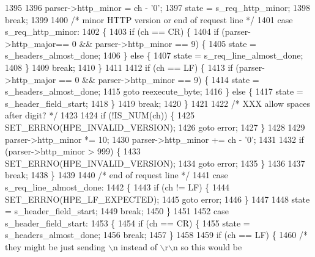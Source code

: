 \begin{DoxyCode}
1395 
1396         parser->http_minor = ch - \textcolor{charliteral}{'0'};
1397         state = s_req_http_minor;
1398         \textcolor{keywordflow}{break};
1399 
1400       \textcolor{comment}{/* minor HTTP version or end of request line */}
1401       \textcolor{keywordflow}{case} s_req_http_minor:
1402       \{
1403         \textcolor{keywordflow}{if} (ch == CR) \{
1404           \textcolor{keywordflow}{if} (parser->http_major== 0 && parser->http_minor == 9) \{
1405             state = s_headers_almost_done;
1406           \} \textcolor{keywordflow}{else} \{
1407             state = s_req_line_almost_done;
1408           \}
1409           \textcolor{keywordflow}{break};
1410         \}
1411 
1412         \textcolor{keywordflow}{if} (ch == LF) \{
1413           \textcolor{keywordflow}{if} (parser->http_major == 0 && parser->http_minor == 9) \{
1414             state = s_headers_almost_done;
1415             \textcolor{keywordflow}{goto} reexecute\_byte;
1416           \} \textcolor{keywordflow}{else} \{
1417             state = s_header_field_start;
1418           \}
1419           \textcolor{keywordflow}{break};
1420         \}
1421 
1422         \textcolor{comment}{/* XXX allow spaces after digit? */}
1423 
1424         \textcolor{keywordflow}{if} (!IS_NUM(ch)) \{
1425           SET_ERRNO(HPE_INVALID_VERSION);
1426           \textcolor{keywordflow}{goto} error;
1427         \}
1428 
1429         parser->http_minor *= 10;
1430         parser->http_minor += ch - \textcolor{charliteral}{'0'};
1431 
1432         \textcolor{keywordflow}{if} (parser->http_minor > 999) \{
1433           SET_ERRNO(HPE_INVALID_VERSION);
1434           \textcolor{keywordflow}{goto} error;
1435         \}
1436 
1437         \textcolor{keywordflow}{break};
1438       \}
1439 
1440       \textcolor{comment}{/* end of request line */}
1441       \textcolor{keywordflow}{case} s_req_line_almost_done:
1442       \{
1443         \textcolor{keywordflow}{if} (ch != LF) \{
1444           SET_ERRNO(HPE_LF_EXPECTED);
1445           \textcolor{keywordflow}{goto} error;
1446         \}
1447 
1448         state = s_header_field_start;
1449         \textcolor{keywordflow}{break};
1450       \}
1451 
1452       \textcolor{keywordflow}{case} s_header_field_start:
1453       \{
1454         \textcolor{keywordflow}{if} (ch == CR) \{
1455           state = s_headers_almost_done;
1456           \textcolor{keywordflow}{break};
1457         \}
1458 
1459         \textcolor{keywordflow}{if} (ch == LF) \{
1460           \textcolor{comment}{/* they might be just sending \(\backslash\)n instead of \(\backslash\)r\(\backslash\)n so this would be}

\end{DoxyCode}
